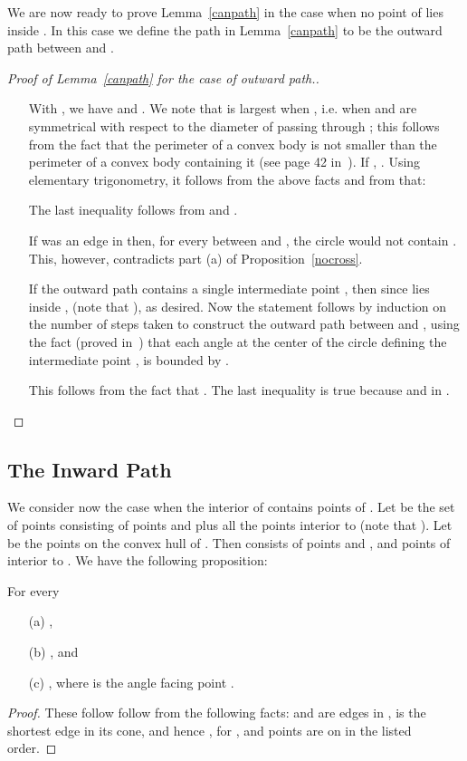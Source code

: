 \documentclass{stacs_proc}
\theoremstyle{plain}\newtheorem{satz}[thm]{Satz}
\begin{document}
We are now ready to prove Lemma~\ref{canpath} in the case when no
point of  lies inside . In this case we define
the path in Lemma~\ref{canpath} to be the outward path between 
and .
\begin{proof}[Proof of Lemma~\ref{canpath} for the case of outward
path.]
\begin{itemize}
\item[]
\item[] With , we have  and . We note that
 is largest
when , i.e. when  and  are symmetrical with
respect to the diameter of  passing through ; this
follows from the fact that the perimeter of a
convex body is not smaller than the perimeter of a convex body
containing it (see page 42 in~\cite{bookconvexity}). If ,
. Using elementary
trigonometry, it follows from the above facts and from
 that:

The last inequality follows from  and .

\item[] If  was an edge in  then, for every  between 
and , the circle  would not contain . This,
however, contradicts part (a) of Proposition~\ref{nocross}.

\item[] If the outward path contains a single intermediate point ,
then since  lies inside ,  (note that
), as desired. Now the statement
follows by induction on the number of steps taken to construct the
outward path between  and , using the fact (proved
in~\cite{keil}) that each angle  at the
center of the circle  defining the intermediate point ,
is bounded by .
\item[] This follows from the fact that . The last inequality is true
because  and  in
.
\end{itemize}
\end{proof}

\subsection{The Inward Path}
\label{inwardpatheuclidean} We consider now the case when the
interior of  contains points of . Let  be the
set of points consisting of points  and  plus all the points
interior to  (note that ). Let 
be the points on the convex hull of . Then  consists of
points  and , and points  of 
interior to . We have the following proposition:


\begin{proposition}
\label{inwardproperties} For every 
\begin{itemize}
\item[(a)] ,
\item[(b)] , and
\item[(c)] , where  is the angle facing point
.
\end{itemize}
\begin{proof}
These follow follow from the following facts:  and  are edges in ,
 is the shortest edge in its cone, and hence , for , and points  are on  in the listed order.
\end{proof}
\end{proposition}
\end{document}
